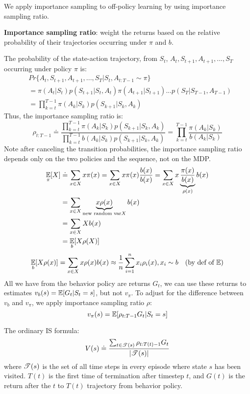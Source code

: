 \documentclass[sutton_barto_notes.tex]{subfiles}
\begin{document}
We apply importance sampling to off-policy learning by using importance sampling ratio.
\begin{definition}
\textbf{Importance sampling ratio}: weight the returns based on the relative probability of their trajectories occurring under $\pi$ and $b$.
\end{definition}
The probability of the state-action trajectory, from $S_t$, $A_t, S_{t+1}, A_{t+1},...,S_T$ occurring under policy $\pi$ is:
\begin{align*}
& Pr\{A_t, S_{t+1}, A_{t+1}, ..., S_T | S_t, A_{t:T-1} \sim \pi\}\\
& = \pi(A_t|S_t)p(S_{t+1} | S_t, A_t) \pi(A_{t+1} | S_{t+1}) ... p(S_T | S_{T-1}, A_{T-1}) \\
& = \prod_{k=t}^{T-1} \pi(A_k|S_k)p(S_{k+1} | S_k, A_k)
\end{align*}
Thus, the importance sampling ratio is:
$$ \rho_{t:T-1} \doteq \frac{\prod_{k=t}^{T-1} \pi(A_k|S_k)p(S_{k+1} | S_k, A_k)}{\prod_{k=t}^{T-1} b(A_k|S_k)p(S_{k+1} | S_k, A_k)} = \prod_{k=t}^{T-1} \frac{\pi(A_k|S_k)}{b(A_k|S_k)} $$
Note after canceling the transition probabilities, the importance sampling ratio depends only on the two policies and the sequence, not on the MDP.
\begin{align*}
\operatorname*{\mathbb{E}}_\pi [X] & \doteq \sum_{x \in X} x \pi(x) = \sum_{x \in X} x\pi(x) \frac{b(x)}{b(x)} = \sum_{x \in X} x \underbrace{\frac{\pi(x)}{b(x)}}_{\rho(x)} b(x) \\
& = \sum_{x \in X} \underbrace{x \rho(x)}_{\text{new random var} X} b(x) \\
& = \sum_{x \in X} X b(x)\\
& = \operatorname*{\mathbb{E}}_b [X \rho(X)]
\end{align*}
$$\operatorname*{\mathbb{E}}_b[X\rho(x)] = \sum_{x \in X} x \rho(x) b(x) \approx \frac{1}{n}\sum_{i=1}^n x_i \rho_i (x), x_i \sim b\quad \text{(by def of $\operatorname*{\mathbb{E}}$)}$$
All we have from the behavior policy are returns $G_t$, we can use these returns to estimates $v_b(s) = \operatorname*{\mathbb{E}} [G_t | S_t = s]$, but not $v_\pi$. To adjust for the difference between $v_b$ and $v_\pi$, we apply importance sampling ratio $\rho$:
$$ v_\pi(s) = \operatorname*{\mathbb{E}} [ \rho_{t:T-1} G_t | S_t = s] $$

The ordinary IS formula:
$$ V(s) \doteq \frac{\sum_{t \in \mathscr{T} (s)} \rho_{t:T(t)-1} G_t }{ | \mathscr{T}(s) |} $$
where $\mathscr{T}(s)$ is the set of all time steps in every episode where state $s$ has been visited. $T(t)$ is the first time of termination after timestep $t$, and $G(t)$ is the return after the $t$ to $T(t)$ trajectory from behavior policy.
\end{document}
